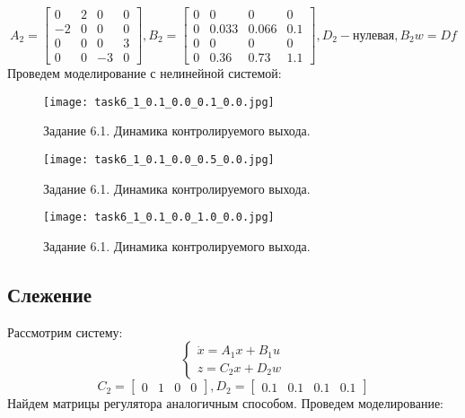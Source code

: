 \begin{equation*}
    A_2 = 
    \begin{bmatrix}
        0 & 2 & 0 & 0 \\
        -2 & 0 & 0 & 0 \\
        0 & 0 & 0 & 3 \\
        0 & 0 & -3 & 0
    \end{bmatrix},
    B_2 = 
    \begin{bmatrix}
        0 & 0 & 0 & 0 \\
        0 & 0.033 & 0.066 & 0.1 \\
        0 & 0 & 0 & 0 \\
        0 & 0.36 & 0.73 & 1.1 
    \end{bmatrix},
    D_2 - \text{нулевая},
    B_2w = Df
\end{equation*}
Проведем моделирование с нелинейной системой:
\begin{figure}[]
    \centering
    \texttt{[image: task6\_1\_0.1\_0.0\_0.1\_0.0.jpg]}
    \caption{Задание 6.1. Динамика контролируемого выхода.}
    \label{fig:task6_1}
\end{figure}
\begin{figure}[]
    \centering
    \texttt{[image: task6\_1\_0.1\_0.0\_0.5\_0.0.jpg]}
    \caption{Задание 6.1. Динамика контролируемого выхода.}
    \label{fig:task6_1}
\end{figure}
\begin{figure}[]
    \centering
    \texttt{[image: task6\_1\_0.1\_0.0\_1.0\_0.0.jpg]}
    \caption{Задание 6.1. Динамика контролируемого выхода.}
    \label{fig:task6_1}
\end{figure}

\subsection{Слежение}
Рассмотрим систему:
\begin{equation}
    \begin{cases}
        \dot{x} = A_1x + B_1u \\
        z = C_2x + D_2w
    \end{cases}
\end{equation}
\begin{equation*}
    C_2 = \begin{bmatrix}
        0 & 1 & 0 & 0
    \end{bmatrix},
    D_2 = \begin{bmatrix}
        0.1 & 0.1 & 0.1 & 0.1
    \end{bmatrix}
\end{equation*}
Найдем матрицы регулятора аналогичным способом.
Проведем моделирование:

